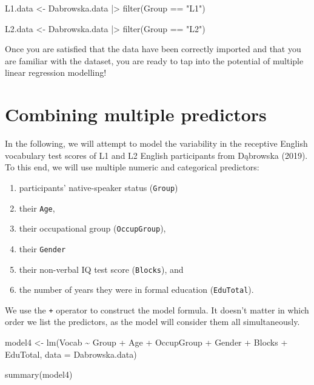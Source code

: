 \documentclass[
  letterpaper,
  DIV=11,
  numbers=noendperiod]{scrreprt}
\newenvironment{Shaded}{\begin{snugshade}}{\end{snugshade}}
\newcommand{\AttributeTok}[1]{\textcolor[rgb]{0.40,0.45,0.13}{#1}}
\newcommand{\FunctionTok}[1]{\textcolor[rgb]{0.28,0.35,0.67}{#1}}
\newcommand{\NormalTok}[1]{\textcolor[rgb]{0.00,0.23,0.31}{#1}}
\newcommand{\OtherTok}[1]{\textcolor[rgb]{0.00,0.23,0.31}{#1}}
\newcommand{\SpecialCharTok}[1]{\textcolor[rgb]{0.37,0.37,0.37}{#1}}
\newcommand{\StringTok}[1]{\textcolor[rgb]{0.13,0.47,0.30}{#1}}
\providecommand{\tightlist}{%
  \setlength{\itemsep}{0pt}\setlength{\parskip}{0pt}}
\begin{document}
\begin{tcolorbox}
\begin{Shaded}
\begin{Highlighting}[]
\NormalTok{L1.data }\OtherTok{\textless{}{-}}\NormalTok{ Dabrowska.data }\SpecialCharTok{|\textgreater{}} 
  \FunctionTok{filter}\NormalTok{(Group }\SpecialCharTok{==} \StringTok{"L1"}\NormalTok{)}

\NormalTok{L2.data }\OtherTok{\textless{}{-}}\NormalTok{ Dabrowska.data }\SpecialCharTok{|\textgreater{}} 
  \FunctionTok{filter}\NormalTok{(Group }\SpecialCharTok{==} \StringTok{"L2"}\NormalTok{)}
\end{Highlighting}
\end{Shaded}

Once you are satisfied that the data have been correctly imported and
that you are familiar with the dataset, you are ready to tap into the
potential of multiple linear regression modelling!~

\end{tcolorbox}

\section{Combining multiple predictors}\label{sec-MultipleLM}

In the following, we will attempt to model the variability in the
receptive English vocabulary test scores of L1 and L2 English
participants from Dąbrowska (2019). To this end, we will use multiple
numeric and categorical predictors:

\begin{enumerate}
\def\labelenumi{\alph{enumi}.}
\tightlist
\item
  participants' native-speaker status (\texttt{Group})
\item
  their \texttt{Age},
\item
  their occupational group (\texttt{OccupGroup}),
\item
  their \texttt{Gender}
\item
  their non-verbal IQ test score (\texttt{Blocks}), and
\item
  the number of years they were in formal education (\texttt{EduTotal}).
\end{enumerate}

We use the \texttt{+} operator to construct the model formula. It
doesn't matter in which order we list the predictors, as the model will
consider them all simultaneously.

\begin{Shaded}
\begin{Highlighting}[]
\NormalTok{model4 }\OtherTok{\textless{}{-}} \FunctionTok{lm}\NormalTok{(Vocab }\SpecialCharTok{\textasciitilde{}}\NormalTok{ Group }\SpecialCharTok{+}\NormalTok{ Age }\SpecialCharTok{+}\NormalTok{ OccupGroup }\SpecialCharTok{+}\NormalTok{ Gender }\SpecialCharTok{+}\NormalTok{ Blocks }\SpecialCharTok{+}\NormalTok{ EduTotal, }
             \AttributeTok{data =}\NormalTok{ Dabrowska.data)}

\FunctionTok{summary}\NormalTok{(model4)}
\end{Highlighting}
\end{Shaded}
\end{document}
